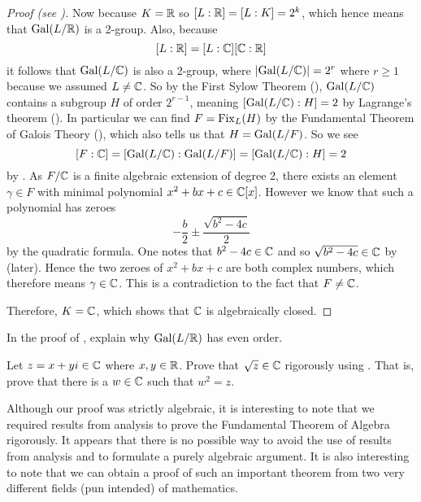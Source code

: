 \begin{proof}[Proof (see {\cite[Theorem 23.34]{judson_beezer_2022}})]
    Now because $K = \mathbb{R}$ so $[L:\mathbb{R}] = [L:K] = 2^k$, which hence means that $\mathrm{Gal}(L/\mathbb{R})$ is a 2-group. Also, because
    \[
        [L:\mathbb{R}] = [L:\mathbb{C}][\mathbb{C}:\mathbb{R}]
    \]
    it follows that $\mathrm{Gal}(L/\mathbb{C})$ is also a 2-group, where $|\mathrm{Gal}(L/\mathbb{C})| = 2^r$ where $r \geq 1$ because we assumed $L \neq \mathbb{C}$. So by the First Sylow Theorem (), $\mathrm{Gal}(L/\mathbb{C})$ contains a subgroup $H$ of order $2^{r-1}$, meaning $[\mathrm{Gal}(L/\mathbb{C}):H] = 2$ by Lagrange's theorem (). In particular we can find $F = \mathrm{Fix}_{L}(H)$ by the Fundamental Theorem of Galois Theory (), which also tells us that $H = \mathrm{Gal}(L/F)$. So we see
    \[
        [F:\mathbb{C}] = [\mathrm{Gal}(L/\mathbb{C}):\mathrm{Gal}(L/F)] = [\mathrm{Gal}(L/\mathbb{C}):H] = 2
    \]
    by . As $F/\mathbb{C}$ is a finite algebraic extension of degree 2, there exists an element $\gamma \in F$ with minimal polynomial $x^2 + bx + c \in \mathbb{C}[x]$. However we know that such a polynomial has zeroes
    \[
        -\frac b2 \pm \frac{\sqrt{b^2 - 4c}}2
    \]
    by the quadratic formula. One notes that $b^2 - 4c \in \mathbb{C}$ and so $\sqrt{b^2-4c} \in \mathbb{C}$ by  (later). Hence the two zeroes of $x^2 + bx + c$ are both complex numbers, which therefore means $\gamma \in \mathbb{C}$. This is a contradiction to the fact that $F \neq \mathbb{C}$.

    Therefore, $K = \mathbb{C}$, which shows that $\mathbb{C}$ is algebraically closed.
\end{proof}

\begin{exercise}\label{exercise-fta-real-extension-has-even-order}
    In the proof of , explain why $\mathrm{Gal}(L/\mathbb{R})$ has even order.
\end{exercise}

\begin{exercise}\label{exercise-square-root-of-complex-number-is-complex-number}
    Let $z = x + yi \in \mathbb{C}$ where $x, y \in \mathbb{R}$. Prove that $\sqrt{z} \in \mathbb{C}$ rigorously using . That is, prove that there is a $w \in \mathbb{C}$ such that $w^2 = z$.
\end{exercise}

Although our proof was strictly algebraic, it is interesting to note that we required results from analysis to prove the Fundamental Theorem of Algebra rigorously. It appears that there is no possible way to avoid the use of results from analysis and to formulate a purely algebraic argument. It is also interesting to note that we can obtain a proof of such an important theorem from two very different fields (pun intended) of mathematics.

